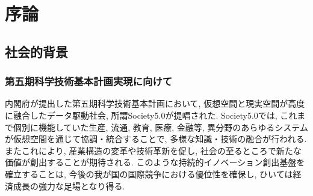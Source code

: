 \chapter{序論}
\begin{comment}
\section{概要}
Neural-Networkによる大規模データセットを用いた機械学習は, 
創薬, 自動運転, 金融に至るまで成果を残しており, 
今後も期待される分野は多岐にわたる.
しかし従来, 大規模な機械学習には大量のGPUと高性能なプロセッサを必要とするため, 
導入は容易ではなかった.
こうした課題を解消し, 機械学習の市場導入を支えてきたのが
クラウドコンピューティングである.

クラウドコンピューティングは処理をデータセンター上で実行し, 
結果を利用者に提供することで
計算機環境に付随する経済的・物理的な制約を解消した.
また, その性質故に情報環境の迅速な整備を可能とし, 
業務の効率化を実現させ情報社会を発展させた.
このような公益的な側面の一方で, 
クラウドコンピューティングは, 
プラットフォーム企業による市場寡占,  
データプライバシーに係る課題の顕在化,  
企業--利用者間の情報の非対称性, 
データセンターの消費電力の増大といった問題を生じさせた.
適切な市場競争の回復, 情報の平等性, 省エネルギー社会の樹立, 
データプライバシーの保護に向けて, 
クラウドコンピューティングに代わる新しいコンピューティング
アーキテクチャであるエッジコンピューティングの技術開発が進められている.
従って, クラウドに依存してきた機械学習においても
エッジコンピューティングへの対応が求められる.

本章では, 国内の次世代型社会基盤と市場創出への期待, 
及び国際的なプライバシー保護の機運の高まりに焦点をあて, 
クラウドコンピューティング依存からの脱却に向けた
国内•国際的な動きについて紹介し, 
エッジコンピューティングにおける機械学習の将来に
ついて述べる.
  
\end{comment}
\section{社会的背景}
\label{背景}
\subsection*{第五期科学技術基本計画実現に向けて}
内閣府が提出した第五期科学技術基本計画\cite{第五期科学技術基本計画}において, 
仮想空間と現実空間が高度に融合したデータ駆動社会, 所謂Society5.0が提唱された.
Society5.0では, 
これまで個別に機能していた生産, 流通, 教育, 医療, 金融等, 
異分野のあらゆるシステムが仮想空間を通じて協調・統合することで, 
多様な知識・技術の融合が行われる. 
またこれにより, 産業構造の変革や技術革新を促し, 
社会の至るところで新たな価値が創出することが期待される.
このような持続的イノベーション創出基盤を確立することは, 
今後の我が国の国際競争における優位性を確保し, ひいては経済成長の強力な足場となり得る.

